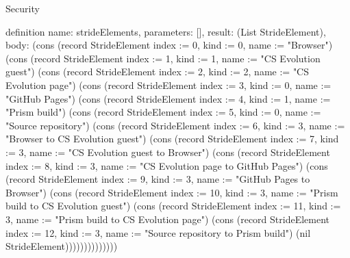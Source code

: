 \begin{lexlean}{Security}
\begin{semanticmodule}
definition{
  name: strideElements,
  parameters: [],
  result: (List StrideElement),
  body: (cons (record StrideElement {index := 0, kind := 0, name := "Browser"}) (cons (record StrideElement {index := 1, kind := 1, name := "CS Evolution guest"}) (cons (record StrideElement {index := 2, kind := 2, name := "CS Evolution page"}) (cons (record StrideElement {index := 3, kind := 0, name := "GitHub Pages"}) (cons (record StrideElement {index := 4, kind := 1, name := "Prism build"}) (cons (record StrideElement {index := 5, kind := 0, name := "Source repository"}) (cons (record StrideElement {index := 6, kind := 3, name := "Browser to CS Evolution guest"}) (cons (record StrideElement {index := 7, kind := 3, name := "CS Evolution guest to Browser"}) (cons (record StrideElement {index := 8, kind := 3, name := "CS Evolution page to GitHub Pages"}) (cons (record StrideElement {index := 9, kind := 3, name := "GitHub Pages to Browser"}) (cons (record StrideElement {index := 10, kind := 3, name := "Prism build to CS Evolution guest"}) (cons (record StrideElement {index := 11, kind := 3, name := "Prism build to CS Evolution page"}) (cons (record StrideElement {index := 12, kind := 3, name := "Source repository to Prism build"}) (nil StrideElement))))))))))))))
}


\end{semanticmodule}
\end{lexlean}
